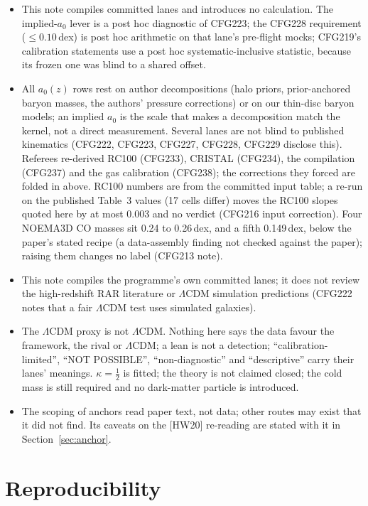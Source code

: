 \documentclass[10pt]{article}
\begin{document}
\begin{itemize}
\item This note compiles committed lanes and introduces no calculation. The implied-$a_0$ lever is a post hoc diagnostic of CFG223; the CFG228 requirement ($\le0.10$\,dex) is post hoc arithmetic on that lane's pre-flight mocks; CFG219's calibration statements use a post hoc systematic-inclusive statistic, because its frozen one was blind to a shared offset.
\item All $a_0(z)$ rows rest on author decompositions (halo priors, prior-anchored baryon masses, the authors' pressure corrections) or on our thin-disc baryon models; an implied $a_0$ is the scale that makes a decomposition match the kernel, not a direct measurement. Several lanes are not blind to published kinematics (CFG222, CFG223, CFG227, CFG228, CFG229 disclose this). Referees re-derived RC100 (CFG233), CRISTAL (CFG234), the compilation (CFG237) and the gas calibration (CFG238); the corrections they forced are folded in above. RC100 numbers are from the committed input table; a re-run on the published Table~3 values (17 cells differ) moves the RC100 slopes quoted here by at most 0.003 and no verdict (CFG216 input correction). Four NOEMA3D CO masses sit 0.24 to 0.26\,dex, and a fifth 0.149\,dex, below the paper's stated recipe (a data-assembly finding not checked against the paper); raising them changes no label (CFG213 note).
\item This note compiles the programme's own committed lanes; it does not review the high-redshift RAR literature or $\Lambda$CDM simulation predictions (CFG222 notes that a fair $\Lambda$CDM test uses simulated galaxies).
\item The $\Lambda$CDM proxy is not $\Lambda$CDM. Nothing here says the data favour the framework, the rival or $\Lambda$CDM; a lean is not a detection; ``calibration-limited'', ``NOT POSSIBLE'', ``non-diagnostic'' and ``descriptive'' carry their lanes' meanings. $\kappa=\tfrac12$ is fitted; the theory is not claimed closed; the cold mass is still required and no dark-matter particle is introduced.
\item The scoping of anchors read paper text, not data; other routes may exist that it did not find. Its caveats on the [HW20] re-reading are stated with it in Section~\ref{sec:anchor}.
\end{itemize}

\section{Reproducibility}\label{sec:rep}
\end{document}
